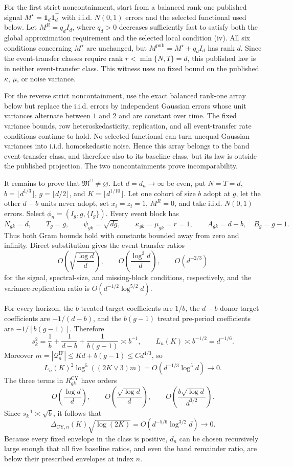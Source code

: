 For the first strict noncontainment, start from a balanced rank-one
published signal \(M^\star=\mathbf1_d\mathbf1_d^\top\) with i.i.d.
\(N(0,1)\) errors and the selected functional used below.  Let
\(M^R=q_dI_d\), where \(q_d>0\) decreases sufficiently fast to satisfy
both the global approximation requirement and the selected local
condition (iv).  All six conditions concerning \(M^\star\) are unchanged,
but \(M^{\mathrm{pub}}=M^\star+q_dI_d\) has rank \(d\).  Since the
event-transfer classes require rank \(r<\min\{N,T\}=d\), this published
law is in neither event-transfer class.  This witness uses no fixed bound
on the published \(\kappa\), \(\mu\), or noise variance.

For the reverse strict noncontainment, use the exact balanced rank-one
array below but replace the i.i.d. errors by independent Gaussian errors
whose unit variances alternate between \(1\) and \(2\) and are constant
over time.  The fixed variance bounds, row heteroskedasticity, replication,
and all event-transfer rate conditions continue to hold.  No selected
functional can turn unequal Gaussian variances into i.i.d. homoskedastic
noise.  Hence this array belongs to the band event-transfer class, and
therefore also to its baseline class, but its law is outside the published
projection.  The two noncontainments prove incomparability.

It remains to prove that \(\mathfrak M^\cap\ne\varnothing\).  Let
\(d=d_n\to\infty\) be even, put \(N=T=d\),
\(b=\lfloor d^{1/3}\rfloor\), \(g=\lfloor d/2\rfloor\), and
\(K=\lfloor d^{1/10}\rfloor\).  Let one cohort of size \(b\) adopt at
\(g\), let the other \(d-b\) units never adopt, set \(x_i=z_t=1\),
\(M^R=0\), and take i.i.d. \(N(0,1)\) errors.  Select
\(\phi_n=(I_g,g,\{I_g\})\).  Every event block has
\[
 N_{gk}=d,\qquad T_g=g,\qquad
 \psi_{gk}=\sqrt{dg},\qquad \kappa_{gk}=\mu_{gk}=r=1,
 \qquad A_{gk}=d-b,\quad B_g=g-1.
\]
Thus both Gram bounds hold with constants bounded away from zero and
infinity.  Direct substitution gives the event-transfer ratios
\[
 O\!\left(\sqrt{\frac{\log d}{d}}\right),\qquad
 O\!\left(\frac{\log^3d}{d}\right),\qquad
 O(d^{-2/3})
\]
for the signal, spectral-size, and missing-block conditions, respectively,
and the variance-replication ratio is
\(O(d^{-1/2}\log^{5/2}d)\).

For every horizon, the \(b\) treated target coefficients are \(1/b\),
the \(d-b\) donor target coefficients are \(-1/(d-b)\), and the
\(b(g-1)\) treated pre-period coefficients are
\(-1/[b(g-1)]\).  Therefore
\[
 s_k^2=\frac1b+\frac1{d-b}+\frac1{b(g-1)}\asymp b^{-1},
 \qquad L_n(K)\asymp b^{-1/2}=d^{-1/6}.
\]
Moreover \(m=|\mathcal Q_n^{\mathrm{IF}}|\le Kd+b(g-1)\le Cd^{4/3}\),
so
\[
 L_n(K)^2\log^5((2K\vee3)m)=O(d^{-1/3}\log^5d)\to0.
\]
The three terms in \(R_{gk}^{\mathrm{CY}}\) have orders
\[
 O\!\left(\frac{\log d}{d}\right),\qquad
 O\!\left(\frac{\sqrt{\log d}}d\right),\qquad
 O\!\left(\frac{b\sqrt{\log d}}{d^{3/2}}\right).
\]
Since \(s_k^{-1}\asymp\sqrt b\), it follows that
\[
 \Delta_{\mathrm{CY},n}(K)\sqrt{\log(2K)}
 =O(d^{-5/6}\log^{3/2}d)\to0.
\]
Because every fixed envelope in the class is positive, \(d_n\) can be
chosen recursively large enough that all five baseline ratios, and even
the band remainder ratio, are below their prescribed envelopes at index
\(n\).

